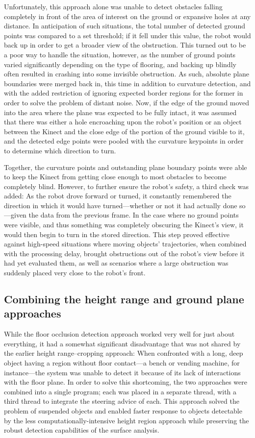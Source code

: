 \documentclass[12pt]{report}
\begin{document}
Unfortunately, this approach alone was unable to detect obstacles falling completely in front of the area of interest on the ground or expansive holes at any distance.  In anticipation of such situations, the total number of detected ground points was compared to a set threshold; if it fell under this value, the robot would back up in order to get a broader view of the obstruction.  This turned out to be a poor way to handle the situation, however, as the number of ground points varied significantly depending on the type of flooring, and backing up blindly often resulted in crashing into some invisible obstruction.  As such, absolute plane boundaries were merged back in, this time in addition to curvature detection, and with the added restriction of ignoring expected border regions for the former in order to solve the problem of distant noise.  Now, if the edge of the ground moved into the area where the plane was expected to be fully intact, it was assumed that there was either a hole encroaching upon the robot's position or an object between the Kinect and the close edge of the portion of the ground visible to it, and the detected edge points were pooled with the curvature keypoints in order to determine which direction to turn.

Together, the curvature points and outstanding plane boundary points were able to keep the Kinect from getting close enough to most obstacles to become completely blind.  However, to further ensure the robot's safety, a third check was added:  As the robot drove forward or turned, it constantly remembered the direction in which it would have turned---whether or not it had actually done so---given the data from the previous frame.  In the case where no ground points were visible, and thus something was completely obscuring the Kinect's view, it would then begin to turn in the stored direction.  This step proved effective against high-speed situations where moving objects' trajectories, when combined with the processing delay, brought obstructions out of the robot's view before it had yet evaluated them, as well as scenarios where a large obstruction was suddenly placed very close to the robot's front.

\subsection[Combining approaches]{Combining the height range and ground plane approaches}
While the floor occlusion detection approach worked very well for just about everything, it had a somewhat significant disadvantage that was not shared by the earlier height range--cropping approach:  When confronted with a long, deep object having a region without floor contact---a bench or vending machine, for instance---the system was unable to detect it because of its lack of interactions with the floor plane.  In order to solve this shortcoming, the two approaches were combined into a single program; each was placed in a separate thread, with a third thread to integrate the steering advice of each.  This approach solved the problem of suspended objects and enabled faster response to objects detectable by the less computationally-intensive height region approach while preserving the robust detection capabilities of the surface analysis.
\end{document}
